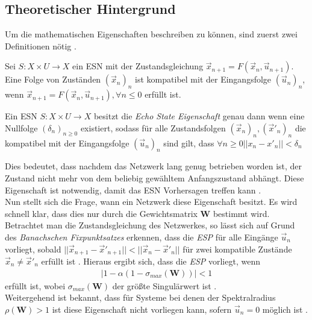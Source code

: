 \subsection{Theoretischer Hintergrund}
\label{sc:theory}
Um die mathematischen Eigenschaften beschreiben zu können, sind zuerst zwei Definitionen nötig \cite{yildiz}.

\begin{definition}
Sei $S : X \times U \rightarrow X$ ein \textsc{ESN} mit der Zustandsgleichung $\vec{x}_{n+1} = F \left( \vec{x}_n, \vec{u}_{n+1} \right)$. Eine Folge von Zuständen $(\vec{x}_n)_n$ ist kompatibel mit der Eingangsfolge $(\vec{u}_n)_n$, wenn $\vec{x}_{n+1} = F\left( \vec{x}_n, \vec{u}_{n+1} \right), \forall n \leq 0$ erfüllt ist.
\end{definition}

\begin{definition}
Ein \textsc{ESN} $S : X \times U \rightarrow X$ besitzt die \textit{Echo State Eigenschaft} genau dann wenn eine Nullfolge $(\delta_n)_{n \geq 0}$ existiert, sodass für alle Zustandsfolgen $(\vec{x}_n)_n, (\vec{x}'_n)_n$ die kompatibel mit der Eingangsfolge $(\vec{u}_n)_n$ sind gilt, dass $\forall n \geq 0 ||x_n - x'_n|| < \delta_n$
\end{definition} 
Dies bedeutet, dass nachdem das Netzwerk lang genug betrieben worden ist, der Zustand nicht mehr von dem beliebig gewähltem Anfangszustand abhängt. Diese Eigenschaft ist notwendig, damit das \textsc{ESN} Vorhersagen treffen kann \cite{jeagerTut2002}.\\

Nun stellt sich die Frage, wann ein Netzwerk diese Eigenschaft besitzt. Es wird schnell klar, dass dies nur durch die Gewichtsmatrix $\mathbf{W}$ bestimmt wird. Betrachtet man die Zustandsgleichung des Netzwerkes, so lässt sich auf Grund des \textit{Banachschen Fixpunktsatzes} erkennen, dass die \textit{ESP} für alle Eingänge $\vec{u}_n$ vorliegt, sobald $||\vec{x}_{n+1} - \vec{x}'_{n+1}|| < ||\vec{x}_n - \vec{x}'_n||$ für zwei kompatible Zustände $\vec{x}_n \neq \vec{x}'_n$ erfüllt ist \cite{jaeger2010}.
Hieraus ergibt sich, dass die \textit{ESP} vorliegt, wenn 
\begin{align}
\label{eq:theory_old_requirement}
|1-\alpha(1-\sigma_{max}(\mathbf{W}))| < 1
\end{align}
erfüllt ist, wobei $\sigma_{max}(\mathbf{W})$ der größte Singulärwert ist \cite{jaeger2007}.\\
Weitergehend ist bekannt, dass für Systeme bei denen der Spektralradius $\rho(\mathbf{W}) > 1$ ist diese Eigenschaft nicht vorliegen kann, sofern $\vec{u}_n = 0$ möglich ist \cite{jaeger2007, jaeger2010}.\\

